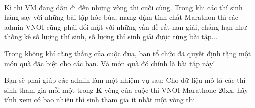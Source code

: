  

Kì thi VM đang dần đi đến những vòng thi cuối cùng. Trong khi các thí sinh hăng say với những bài tập hóc búa, mang đậm tính chất Marathon thì các admin VNOI cũng phải đối mặt với những vấn đề rất nan giải, chẳng hạn như thống kê số lượng thí sinh, số lượng thí sinh giải được từng bài tập...

Trong không khí căng thẳng của cuộc đua, ban tổ chức đã quyết định tặng một món quà đặc biệt cho các bạn. Và món quà đó chính là bài tập này!

Bạn sẽ phải giúp các admin làm một nhiệm vụ sau: Cho dữ liệu mô tả các thí sinh tham gia mỗi một trong \textbf{ K } vòng của cuộc thi VNOI Marathone 20xx, hãy tính xem có bao nhiêu thí sinh tham gia ít nhất một vòng thi.

\